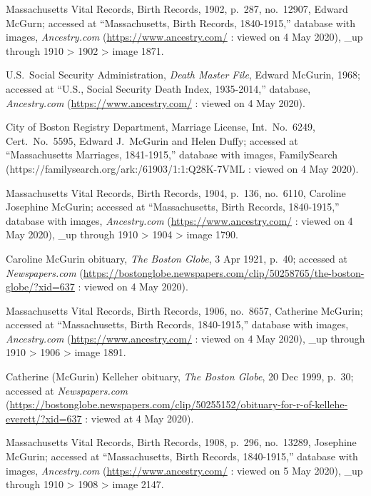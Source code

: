 \begin{thebibliography}{999}
	Massachusetts Vital Records, Birth Records, 1902, p.\ 287, no.\ 12907, Edward McGurn; accessed at ``Massachusetts, Birth Records, 1840-1915,'' database with images, \textit{Ancestry.com} (\url{https://www.ancestry.com/} : viewed on 4 May 2020), \_up through 1910 > 1902 > image 1871.
	
	U.S.\ Social Security Administration, \textit{Death Master File}, Edward McGurin, 1968; accessed at ``U.S., Social Security Death Index, 1935-2014,'' database, \textit{Ancestry.com} (\url{https://www.ancestry.com/} : viewed on 4 May 2020).
	
	City of Boston Registry Department, Marriage License, Int.\ No.\ 6249, Cert.\ No.\ 5595, Edward J.\ McGurin and Helen Duffy; accessed at ``Massachusetts Marriages, 1841-1915,'' database with images, FamilySearch (https://familysearch.org/ark:/61903/1:1:Q28K-7VML : viewed on 4 May 2020).
	
	Massachusetts Vital Records, Birth Records, 1904, p.\ 136, no.\ 6110, Caroline Josephine McGurin; accessed at ``Massachusetts, Birth Records, 1840-1915,'' database with images, \textit{Ancestry.com} (\url{https://www.ancestry.com/} : viewed on 4 May 2020), \_up through 1910 > 1904 > image 1790.	
	
	Caroline McGurin obituary, \textit{The Boston Globe}, 3 Apr 1921, p.\ 40; accessed at \textit{Newspapers.com} (\url{https://bostonglobe.newspapers.com/clip/50258765/the-boston-globe/?xid=637} : viewed on 4 May 2020).
	
	Massachusetts Vital Records, Birth Records, 1906, no.\ 8657, Catherine McGurin; accessed at ``Massachusetts, Birth Records, 1840-1915,'' database with images, \textit{Ancestry.com} (\url{https://www.ancestry.com/} : viewed on 4 May 2020), \_up through 1910 > 1906 > image 1891.	
		
	Catherine (McGurin) Kelleher obituary, \textit{The Boston Globe}, 20 Dec 1999, p.\ 30; accessed at \textit{Newspapers.com} (\url{https://bostonglobe.newspapers.com/clip/50255152/obituary-for-r-of-kellehe-everett/?xid=637} : viewed at 4 May 2020).
	
	Massachusetts Vital Records, Birth Records, 1908, p.\ 296, no.\ 13289, Josephine McGurin; accessed at ``Massachusetts, Birth Records, 1840-1915,'' database with images, \textit{Ancestry.com} (\url{https://www.ancestry.com/} : viewed on 5 May 2020), \_up through 1910 > 1908 > image 2147.	
	

\end{thebibliography}
